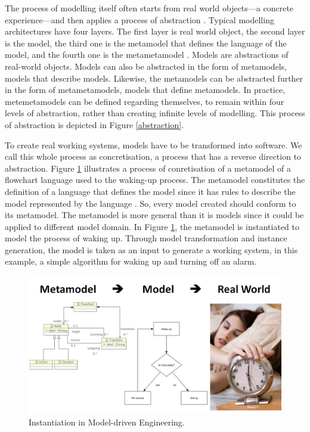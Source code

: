 \documentclass[12pt, a4paper]{report}
\begin{document}
{The process of modelling itself often starts from real world objects---a concrete experience---and then applies a process of abstraction \cite{white2010teaching, engels2005teaching}. Typical modelling architectures have four layers. The first layer is real world object, the second layer is the model, the third one is the metamodel that defines the language of the model, and the fourth one is the metametamodel \cite{brambilla2012model}. Models are abstractions of real-world objects. Models can also be abstracted in the form of metamodels, models that describe models. Likewise, the metamodels can be abstracted further in the form of metametamodels, models that define metamodels. In practice, metemetamodels can be defined regarding themselves, to remain within four levels of abstraction, rather than creating infinite levels of modelling. This process of abstraction is depicted in Figure \ref{abstraction}.
 
To create real working systems, models have to be transformed into software. We call this whole process as concretisation, a process that has a reverse direction to abstraction. Figure \ref{concretisation} illustrates a process of conretisation of a metamodel of a flowchart language used to the waking-up process. The metamodel constitutes the definition of a language that defines the model since it has rules to describe the model represented by the language \cite{brambilla2012model}. So, every model created should conform to its metamodel. The metamodel is more general than it is models since it could be applied to different model domain. In Figure \ref{concretisation}, the metamodel is instantiated to model the process of waking up. Through model transformation and instance generation, the model is taken as an input to generate a working system, in this example, a simple algorithm for waking up and turning off an alarm.   

\begin{figure}[!t]
\centering
\includegraphics[width=13cm]{concretisation}
\caption{Instantiation in Model-driven Engineering.}
\label{concretisation}
\end{figure}
   
}
\end{document}
